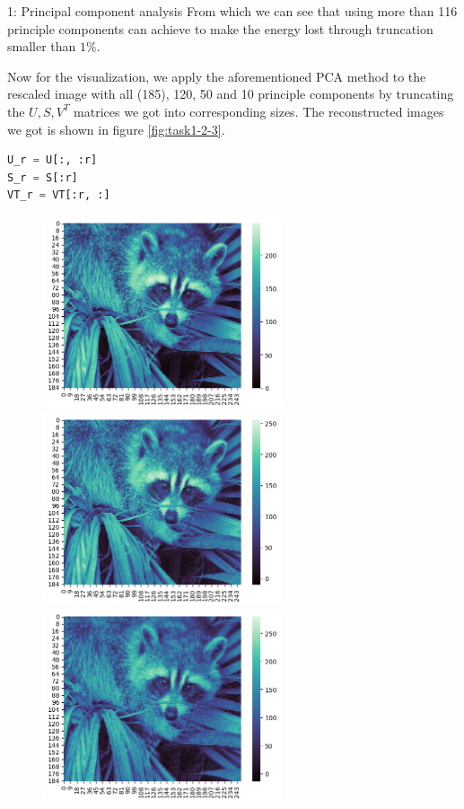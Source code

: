 \documentclass[10pt,a4paper]{article}
\begin{document}
\begin{task}{1: Principal component analysis}
From which we can see that using more than 116 principle components can achieve to make the energy lost through truncation smaller than $1\%$. 

Now for the visualization, we apply the aforementioned PCA method to the rescaled image with all (185), 120, 50 and 10 principle components by truncating the $U, S, V^T$ matrices we got into corresponding sizes. The reconstructed images we got is shown in figure \ref{fig:task1-2-3}.

\begin{lstlisting}[language = Python, label={decoupling}]
U_r = U[:, :r]
S_r = S[:r]
VT_r = VT[:r, :]
\end{lstlisting}

\begin{figure} [H]
    \centering
    \includegraphics[width=7cm]{images/task1-2-185.png}
    \includegraphics[width=7cm]{images/task1-2-120.png}
    \includegraphics[width=7cm]{images/task1-2-50.png}

\end{figure}
\end{task}
\end{document}
